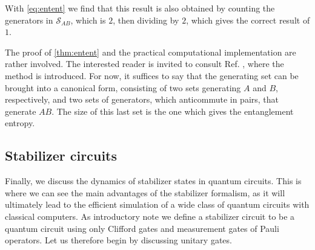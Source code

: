With \cref{eq:entent} we find that this result is also obtained by counting the
generators in $\mathcal{S}_{AB}$, which is $2$, then dividing by $2$, which
gives the correct result of $1$. 

The proof of \cref{thm:entent} and the practical computational implementation
are rather involved. The interested reader is invited to consult Ref.
\cite{fattalEntanglementStabilizerFormalism2004}, where the method is
introduced. For now, it suffices to say that the generating set can be brought
into a canonical form, consisting of two sets generating $A$ and $B$,
respectively, and two sets of generators, which anticommute in pairs, that
generate $AB$. The size of this last set is the one which gives the
entanglement entropy.

\subsection{Stabilizer circuits}\label{sec:stabilizercircuits}

Finally, we discuss the dynamics of stabilizer states in quantum circuits. This
is where we can see the main advantages of the stabilizer formalism, as it will
ultimately lead to the efficient simulation of a wide class of quantum circuits
with classical computers. 
As introductory note we define a stabilizer circuit to be a quantum
circuit using only Clifford gates and measurement gates of Pauli operators. Let
us therefore begin by discussing unitary gates.

